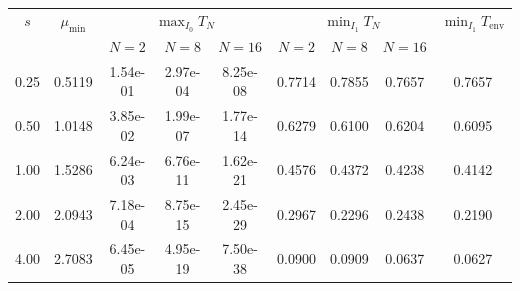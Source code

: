 \begin{tabular}{c|c|ccc|ccc|c}
\hline
$s$ & $\mu_{\min}$ & \multicolumn{3}{c|}{$\max_{I_0} T_N$} & \multicolumn{3}{c|}{$\min_{I_1} T_N$} & $\min_{I_1} T_{\mathrm{env}}$ \\
    &              & $N=2$ & $N=8$ & $N=16$ & $N=2$ & $N=8$ & $N=16$ & \\
\hline

0.25 & 0.5119 & 1.54e-01 & 2.97e-04 & 8.25e-08 & 0.7714 & 0.7855 & 0.7657 & 0.7657 \\
0.50 & 1.0148 & 3.85e-02 & 1.99e-07 & 1.77e-14 & 0.6279 & 0.6100 & 0.6204 & 0.6095 \\
1.00 & 1.5286 & 6.24e-03 & 6.76e-11 & 1.62e-21 & 0.4576 & 0.4372 & 0.4238 & 0.4142 \\
2.00 & 2.0943 & 7.18e-04 & 8.75e-15 & 2.45e-29 & 0.2967 & 0.2296 & 0.2438 & 0.2190 \\
4.00 & 2.7083 & 6.45e-05 & 4.95e-19 & 7.50e-38 & 0.0900 & 0.0909 & 0.0637 & 0.0627 \\
\hline
\end{tabular}